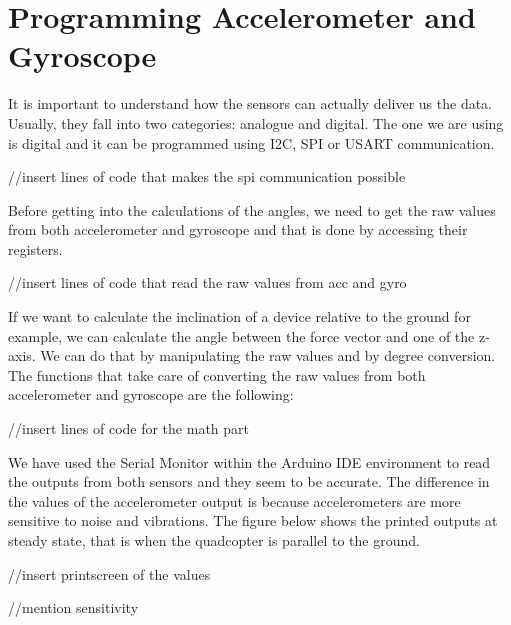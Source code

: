 \section{Programming Accelerometer and Gyroscope}

It is important to understand how the sensors can actually deliver us the data. Usually, they fall into two categories: analogue and digital. The one we are using is digital and it can be programmed using I2C, SPI or USART communication. 

//insert lines of code that makes the spi communication possible

Before getting into the calculations of the angles, we need to get the raw values from both accelerometer and gyroscope and that is done by accessing their registers.

//insert lines of code that read the raw values from acc and gyro

If we want to calculate the inclination of a device relative to the ground for example, we can calculate the angle between the force vector and one of the z-axis. We can do that by manipulating the raw values and by degree conversion. The functions that take care of converting the raw values from both accelerometer and gyroscope are the following:

//insert lines of code for the math part

We have used the Serial Monitor within the Arduino IDE environment to read the outputs from both sensors and they seem to be accurate. The difference in the values of the accelerometer output is because accelerometers are more sensitive to noise and vibrations. The figure below shows the printed outputs at steady state, that is when the quadcopter is parallel to the ground.

//insert printscreen of the values


//mention sensitivity 